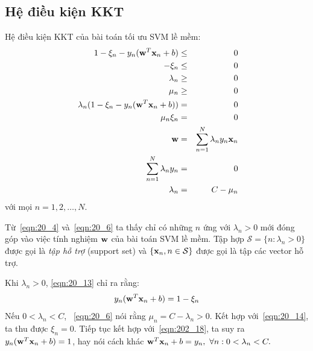 \subsection{Hệ điều kiện KKT}

Hệ điều kiện KKT của bài toán tối ưu SVM lề mềm:
\begin{eqnarray}
\label{eqn:20_9}
1 - \xi_n - y_n(\mathbf{w}^T\mathbf{x}_n + b) &\leq& 0  \\\
\label{eqn:20_10}
-\xi_n &\leq& 0 \\\
\label{eqn:20_11}
\lambda_n &\geq& 0 \\\
\label{eqn:20_12}
\mu_n &\geq & 0 \\\
\label{eqn:20_13}
\lambda_n ( 1 - \xi_n - y_n(\mathbf{w}^T\mathbf{x}_n + b)) &=& 0 \\\
\label{eqn:20_14}
\mu_n \xi_n &=& 0 \\\
\setcounter{equation}{6}
\label{eqn:20_4}
\mathbf{w} &=& \sum_{n=1}^N \lambda_n y_n \mathbf{x}_n \\\
\sum_{n=1}^N \lambda_n y_n &=& 0 \\\
\label{eqn:20_6}
\lambda_n &=& C - \mu_n
\end{eqnarray}
với
mọi $n = 1, 2, \dots, N$.

Từ~\eqref{eqn:20_4} và~\eqref{eqn:20_6} ta thấy chỉ có những $n$ ứng với $\lambda_n > 0$ mới đóng
góp
vào việc tính nghiệm $\mathbf{w}$ của bài toán SVM lề mềm. Tập hợp $\mathcal{S} = \{n: \lambda_n > 0\}$
được gọi là \textit{tập hỗ trợ} (support set) và $\{\mathbf{x}_n, n \in \mathcal{S}\}$ được gọi là
tập các vector hỗ trợ.
\setcounter{equation}{17}

\def\NM{N_{\mathcal{M}}}
Khi $\lambda_n > 0$, \eqref{eqn:20_13} chỉ ra rằng:
\begin{equation}
\label{eqn:202_18}
y_n(\mathbf{w}^T\mathbf{x}_n + b) = 1 - \xi_n
\end{equation}
Nếu $0<\lambda_n < C$, ~\eqref{eqn:20_6} nói rằng $\mu_n = C
- \lambda_n > 0$. Kết hợp với~\eqref{eqn:20_14}, ta thu được $\xi_n = 0$. Tiếp
tục kết hợp với~\eqref{eqn:202_18}, ta suy ra $y_n(\mathbf{w}^T\mathbf{x}_n + b) = 1$, hay nói
cách khác
\begin{math}
\mathbf{w}^T\mathbf{x}_n + b = y_n, ~\forall n: 0 < \lambda_n < C.
\end{math}

